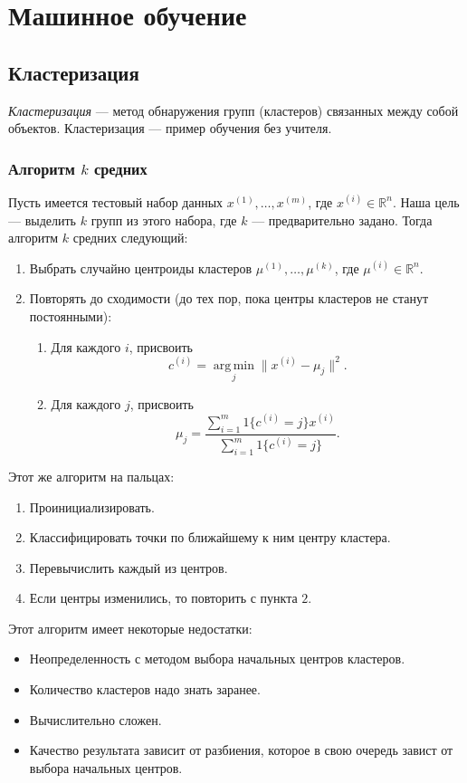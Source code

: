 \chapter{Машинное обучение}
\label{ch:ml}

\section{Кластеризация}
\emph{Кластеризация} — метод обнаружения групп (кластеров) связанных между собой объектов. Кластеризация — пример обучения без учителя.

\subsection{Алгоритм $k$ средних}
Пусть имеется тестовый набор данных $x^{(1)}, \dots, x^{(m)}$, где $x^{(i)} \in \mathbb{R}^n$. Наша цель — выделить $k$ групп из этого набора, где $k$ — предварительно задано. Тогда алгоритм $k$ средних следующий:
\begin{enumerate}
  \item Выбрать случайно центроиды кластеров $\mu^{(1)}, \dots, \mu^{(k)}$, где $\mu^{(i)} \in \mathbb{R}^n$.
  \item Повторять до сходимости (до тех пор, пока центры кластеров не станут постоянными):
    \begin{enumerate}
      \item Для каждого $i$, присвоить \[ c^{(i)} = \operatorname*{arg\,min}_j \| x^{(i)} - \mu_j \|^2. \]
      \item Для каждого $j$, присвоить \[ \mu_j = \frac{\sum_{i = 1}^{m}{1\{ c^{(i)} = j \} x^{(i)}}}{\sum_{i = 1}^{m}{1\{ c^{(i)} = j \}}}. \]
    \end{enumerate}
\end{enumerate}

Этот же алгоритм на пальцах:
\begin{enumerate}
  \item Проинициализировать.
  \item Классифицировать точки по ближайшему к ним центру кластера.
  \item Перевычислить каждый из центров.
  \item Если центры изменились, то повторить с пункта $2$.
\end{enumerate}

Этот алгоритм имеет некоторые недостатки:
\begin{itemize}
  \item Неопределенность с методом выбора начальных центров кластеров.
  \item Количество кластеров надо знать заранее.
  \item Вычислительно сложен.
  \item Качество результата зависит от разбиения, которое в свою очередь завист от выбора начальных центров.
\end{itemize}

